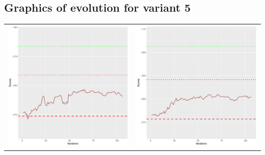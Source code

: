 \documentclass[]{scrartcl}
\begin{document}
\clearpage

\subsection{Graphics of evolution for variant 5}

\begin{table}[h!]
\begin{tabular}{cc}
\includegraphics[scale = 0.4]{./figs/asia/v5/10/boundsEvolution-107.pdf} & 
\includegraphics[scale = 0.4]{./figs/asia/v5/20/boundsEvolution-107.pdf} \\

\end{tabular}
\end{table}
\end{document}
